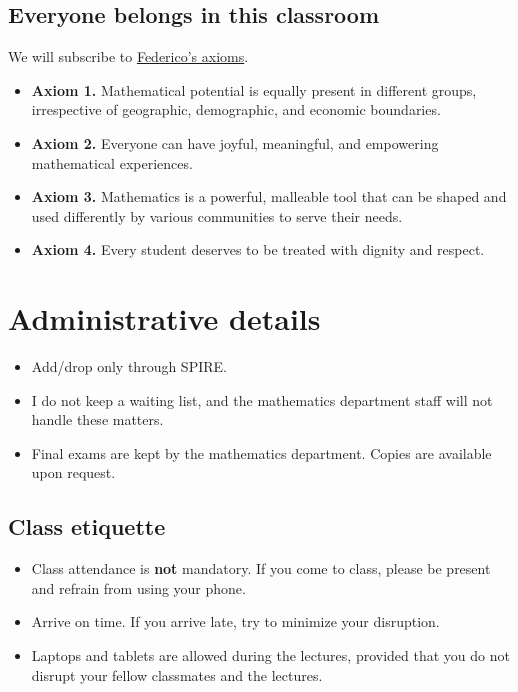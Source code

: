 \documentclass[11pt]{article}
\begin{document}
\subsection{Everyone belongs in this classroom}
\label{sec:org998fa30}
We will subscribe to \href{https://www.ams.org/publications/journals/notices/201610/rnoti-p1164.pdf}{Federico's axioms}.

\begin{itemize}
\item \textbf{Axiom 1.} Mathematical potential is equally present in different groups,
irrespective of geographic, demographic, and economic boundaries.

\item \textbf{Axiom 2.} Everyone can have joyful, meaningful, and empowering mathematical
experiences.

\item \textbf{Axiom 3.} Mathematics is a powerful, malleable tool that can be shaped and
used differently by various communities to serve their needs.

\item \textbf{Axiom 4.} Every student deserves to be treated with dignity and respect.
\end{itemize}

\section{Administrative details}
\label{sec:org2f87aa5}
\begin{itemize}
\item Add/drop only through SPIRE.
\item I do not keep a waiting list, and the mathematics department staff will not
handle these matters.
\item Final exams are kept by the mathematics department. Copies are available upon request.
\end{itemize}
\subsection{Class etiquette}
\label{sec:orgd7f6f6b}
\begin{itemize}
\item Class attendance is \textbf{not} mandatory. If you come to class, please be present
and refrain from using your phone.
\item Arrive on time. If you arrive late, try to minimize your disruption.
\item Laptops and tablets are allowed during the lectures, provided that you do not
disrupt your fellow classmates and the lectures.
\end{itemize}
\end{document}
